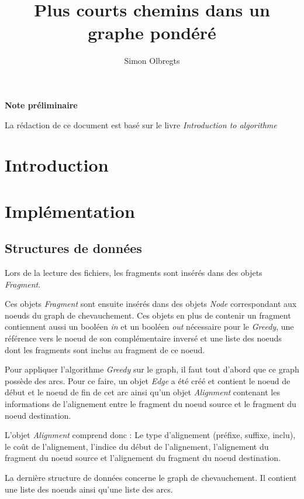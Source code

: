 \documentclass[12pt,a4paper,final]{article}
\author{Simon Olbregts}
\title{Plus courts chemins dans un graphe pondéré}
\newcommand{\smalltitle}[1]{\bigskip\large\textbf{#1}\par\normalsize\medskip}
\begin{document}
\umonsCoverPage
\pagebreak

\pagestyle{fancy}

\thispagestyle{empty}
\newpage
\tableofcontents
\newpage

\smalltitle{Note préliminaire}
La rédaction de ce document est basé sur le livre \textit{Introduction to algorithme}~\cite{intro_to_algo}

\section{Introduction}

\section{Implémentation}
\subsection{Structures de données}

Lors de la lecture des fichiers, les fragments sont insérés dans des objets \textit{Fragment}.\medskip

Ces objets \textit{Fragment} sont ensuite insérés dans des objets \textit{Node} correspondant aux noeuds du graph de chevauchement.  Ces objets en plus de contenir un fragment contiennent aussi un booléen \textit{in} et un booléen \textit{out} nécessaire pour le \textit{Greedy}, une référence vers le noeud de son complémentaire inversé et une liste des noeuds dont les fragments sont inclus au fragment de ce noeud.\medskip

Pour appliquer l'algorithme \textit{Greedy} sur le graph, il faut tout d'abord que ce graph possède des arcs.  Pour ce faire, un objet \textit{Edge} a été créé et contient le noeud de début et le noeud de fin de cet arc ainsi qu'un objet \textit{Alignment} contenant les informations de l'alignement entre le fragment du noeud source et le fragment du noeud destination.\medskip

L'objet \textit{Alignment} comprend donc : Le type d'alignement (préfixe, suffixe, inclu), le coût de l'alignement, l'indice du début de l'alignement, l'alignement du fragment du noeud source et l'alignement du fragment du noeud destination.\medskip

La dernière structure de données concerne le graph de chevauchement.  Il contient une liste des noeuds ainsi qu'une liste des arcs.
\end{document}
